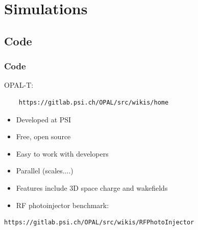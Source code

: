 \documentclass[professionalfonts,t]{beamer}
\begin{document}
\section{Simulations}
\subsection{Code}
\begin{frame}[containsverbatim]
\frametitle{Code}
OPAL-T: \begin{verbatim}
	https://gitlab.psi.ch/OPAL/src/wikis/home
\end{verbatim}
\begin{itemize}
\item Developed at PSI
\item Free, open source 
\item Easy to work with developers
\item Parallel (scales....)
\item Features include 3D space charge and wakefields
\item RF photoinjector benchmark:
\end{itemize}
\begin{verbatim}
https://gitlab.psi.ch/OPAL/src/wikis/RFPhotoInjector
\end{verbatim}
\end{frame}
\end{document}
